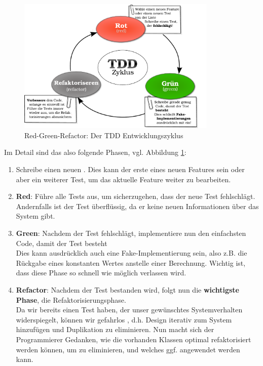   \begin{figure}[htbp]
 \centering
 \includegraphics[width=0.85\textwidth]{./diagrams/red-green-refactor.pdf}
 \caption{Red-Green-Refactor: Der TDD Entwicklungszyklus}
  \label{fig:redgreenrefactor}
\end{figure}
  Im Detail sind das also folgende Phasen, vgl. Abbildung \ref{fig:redgreenrefactor}:
  \begin{enumerate}
   \item Schreibe einen neuen . Dies kann der erste eines neuen Features sein oder aber ein weiterer Test, um das aktuelle Feature weiter zu bearbeiten.
   \item \textbf{Red}: Führe alle Tests aus, um sicherzugehen, dass der neue Test fehlschlägt. Andernfalls ist der Test überflüssig, da er keine neuen Informationen über das System gibt.
   \item \textbf{Green}: Nachdem der Test fehlschlägt, implementiere nun den einfachsten Code, damit der Test besteht\\
   Dies kann ausdrücklich auch eine Fake-Implementierung sein, also z.B. die Rückgabe eines konstanten Wertes anstelle einer Berechnung. Wichtig ist, dass diese Phase so schnell wie möglich verlassen wird.
   \item \textbf{Refactor}: Nachdem der Test bestanden wird, folgt nun die \textbf{wichtigste Phase}, die Refaktorisierungsphase.\\
   Da wir bereits einen Test haben, der unser gewünschtes Systemverhalten widerspiegelt, können wir gefahrlos , d.h. Design iterativ zum System hinzufügen und Duplikation zu eliminieren. Nun macht sich der Programmierer Gedanken, wie die vorhanden Klassen optimal refaktorisiert werden können, um  zu eliminieren, und welches  ggf. angewendet werden kann.
  \end{enumerate}


